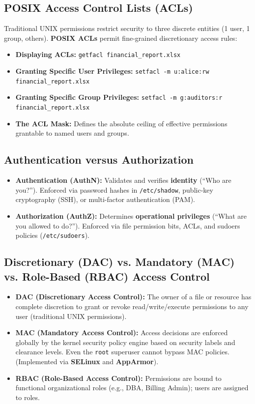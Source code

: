 \subsection{POSIX Access Control Lists (ACLs)}
Traditional UNIX permissions restrict security to three discrete entities (1 user, 1 group, others). \textbf{POSIX ACLs} permit fine-grained discretionary access rules:
\begin{itemize}
    \item \textbf{Displaying ACLs:} \texttt{getfacl financial\_report.xlsx}
    \item \textbf{Granting Specific User Privileges:} \texttt{setfacl -m u:alice:rw financial\_report.xlsx}
    \item \textbf{Granting Specific Group Privileges:} \texttt{setfacl -m g:auditors:r financial\_report.xlsx}
    \item \textbf{The ACL Mask:} Defines the absolute ceiling of effective permissions grantable to named users and groups.
\end{itemize}

\subsection{Authentication versus Authorization}
\begin{itemize}
    \item \textbf{Authentication (AuthN):} Validates and verifies \textbf{identity} (``Who are you?''). Enforced via password hashes in \texttt{/etc/shadow}, public-key cryptography (SSH), or multi-factor authentication (PAM).
    \item \textbf{Authorization (AuthZ):} Determines \textbf{operational privileges} (``What are you allowed to do?''). Enforced via file permission bits, ACLs, and sudoers policies (\texttt{/etc/sudoers}).
\end{itemize}

\subsection{Discretionary (DAC) vs. Mandatory (MAC) vs. Role-Based (RBAC) Access Control}
\begin{itemize}
    \item \textbf{DAC (Discretionary Access Control):} The owner of a file or resource has complete discretion to grant or revoke read/write/execute permissions to any user (traditional UNIX permissions).
    \item \textbf{MAC (Mandatory Access Control):} Access decisions are enforced globally by the kernel security policy engine based on security labels and clearance levels. Even the \texttt{root} superuser cannot bypass MAC policies. (Implemented via \textbf{SELinux} and \textbf{AppArmor}).
    \item \textbf{RBAC (Role-Based Access Control):} Permissions are bound to functional organizational roles (e.g., DBA, Billing Admin); users are assigned to roles.
\end{itemize}

